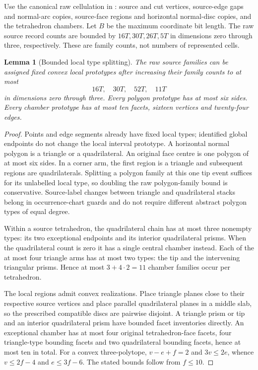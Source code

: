 \documentclass[11pt]{article}
\newtheorem{lemma}[theorem]{Lemma}
\theoremstyle{definition}\newtheorem{definition}[theorem]{Definition}
\theoremstyle{remark}\newtheorem{remark}[theorem]{Remark}
\begin{document}
Use the canonical raw cellulation in \cite{rawcut}: source and cut vertices, source-edge gaps and normal-arc copies, source-face regions and horizontal normal-disc copies, and the tetrahedron chambers. Let \(B\) be the maximum coordinate bit length. The raw source record counts are bounded by \(16T,30T,26T,5T\) in dimensions zero through three, respectively. These are family counts, not numbers of represented cells.

\begin{lemma}[Bounded local type splitting]\label{lem:type-splitting}
The raw source families can be assigned fixed convex local prototypes after increasing their family counts to at most
\[
                         16T,\quad30T,\quad52T,\quad11T
\]
in dimensions zero through three. Every polygon prototype has at most six sides. Every chamber prototype has at most ten facets, sixteen vertices and twenty-four edges.
\end{lemma}
\begin{proof}
Points and edge segments already have fixed local types; identified global endpoints do not change the local interval prototype. A horizontal normal polygon is a triangle or a quadrilateral. An original face centre is one polygon of at most six sides. In a corner arm, the first region is a triangle and subsequent regions are quadrilaterals. Splitting a polygon family at this one tip event suffices for its unlabelled local type, so doubling the raw polygon-family bound is conservative. Source-label changes between triangle and quadrilateral stacks belong in occurrence-chart guards and do not require different abstract polygon types of equal degree.

Within a source tetrahedron, the quadrilateral chain has at most three nonempty types: its two exceptional endpoints and its interior quadrilateral prisms. When the quadrilateral count is zero it has a single central chamber instead. Each of the at most four triangle arms has at most two types: the tip and the intervening triangular prisms. Hence at most \(3+4\cdot2=11\) chamber families occur per tetrahedron.

The local regions admit convex realizations. Place triangle planes close to their respective source vertices and place parallel quadrilateral planes in a middle slab, so the prescribed compatible discs are pairwise disjoint. A triangle prism or tip and an interior quadrilateral prism have bounded facet inventories directly. An exceptional chamber has at most four original tetrahedron-face facets, four triangle-type bounding facets and two quadrilateral bounding facets, hence at most ten in total. For a convex three-polytope, \(v-e+f=2\) and \(3v\leq2e\), whence \(v\leq2f-4\) and \(e\leq3f-6\). The stated bounds follow from \(f\leq10\).
\end{proof}
\end{document}
